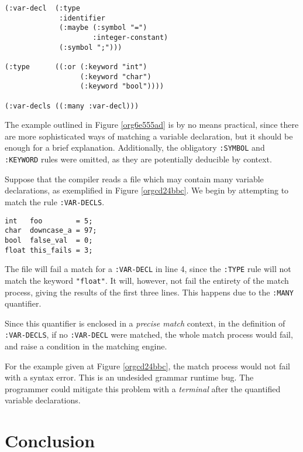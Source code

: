\documentclass[a4paper,11pt,oneside]{article}
\begin{document}
\begin{verbatim}
(:var-decl  (:type
             :identifier
             (:maybe (:symbol "=")
                     :integer-constant)
             (:symbol ";")))

(:type      ((:or (:keyword "int")
                  (:keyword "char")
                  (:keyword "bool"))))

(:var-decls ((:many :var-decl)))
\end{verbatim}
\hfill \break

The example outlined in Figure \ref{org6e555ad} is by no means
practical, since there are more sophisticated ways of matching a
variable declaration, but it should be enough for a brief
explanation. Additionally, the obligatory \texttt{:SYMBOL} and \texttt{:KEYWORD} rules
were omitted, as they are potentially deducible by context.

Suppose that the compiler reads a file which may contain many variable
declarations, as exemplified in Figure \ref{orgcd24bbc}. We begin by
attempting to match the rule \texttt{:VAR-DECLS}.

\begin{verbatim}
int   foo        = 5;
char  downcase_a = 97;
bool  false_val  = 0;
float this_fails = 3;
\end{verbatim}
\hfill \break

The file will fail a match for a \texttt{:VAR-DECL} in line 4, since the \texttt{:TYPE}
rule will not match the keyword \texttt{"float"}. It will, however, not fail
the entirety of the match process, giving the results of the first
three lines. This happens due to the \texttt{:MANY} quantifier.

Since this quantifier is enclosed in a \emph{precise match} context, in the
definition of \texttt{:VAR-DECLS}, if no \texttt{:VAR-DECL} were matched, the whole
match process would fail, and raise a condition in the matching
engine.

For the example given at Figure \ref{orgcd24bbc}, the match process would
not fail with a syntax error. This is an undesided grammar runtime
bug. The programmer could mitigate this problem with a \emph{terminal} after
the quantified variable declarations.

\section{Conclusion}
\label{sec:orgedd9eff}
\end{document}
